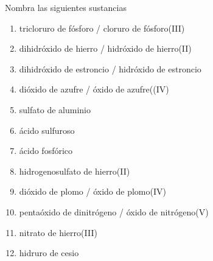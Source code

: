 \documentclass[10pt,a5paper,twoside]{article}
\begin{document}
\begin{exercise}[
    tags    = {inorgánica,nomenclatura,múltiple,2B},
    topics  = {química inorgánica,formulación,nomenclatura},
    source  = {Química 2B SAN 2016, p372, e6},
  ]
  Nombra las siguientes sustancias

  \begin{enumerate}\begin{multicols}{2}
    \item {}
    \item {}
    \item {}
    \item {}
    \item {}
    \item {}
    \item {}
    \item {}
    \item {}
    \item {}
    \item {}
    \item {}
  \end{multicols}\end{enumerate}
\end{exercise}

\begin{solution}
  \begin{enumerate}
    \item tricloruro de fósforo / cloruro de fósforo(III)
    \item dihidróxido de hierro / hidróxido de hierro(II)
    \item dihidróxido de estroncio / hidróxido de estroncio
    \item dióxido de azufre / óxido de azufre((IV)
    \item sulfato de aluminio
    \item ácido sulfuroso
    \item ácido fosfórico
    \item hidrogenosulfato de hierro(II)
    \item dióxido de plomo / óxido de plomo(IV)
    \item pentaóxido de dinitrógeno / óxido de nitrógeno(V)
    \item nitrato de hierro(III)
    \item hidruro de cesio
  \end{enumerate}
\end{solution}
\end{document}
